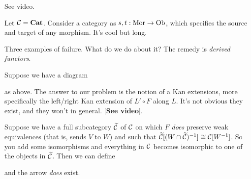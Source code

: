 \documentclass[class=report, crop=false,a4paper,twoside]{standalone}
\begin{document}
\begin{example}[(Limits)]
	See video.
\end{example}

\begin{example}
	Let $\mathcal{C} = \mathbf{Cat}$. Consider a category as $s,t: \operatorname{Mor} \to \operatorname{Ob}$, which specifies the source and target of any morphism. It's cool but long.
\end{example}

Three examples of failure. What do we do about it? The remedy is \emph{derived functors}. 

Suppose we have a diagram
\begin{center}
\end{center}
as above. The answer to our problem is the notion of a Kan extensions, more specifically the left/right Kan extension of $L' \circ F$ along $L$. It's not obvious they exist, and they won't in general. [\textbf{See video}]. 

Suppose we have a full subcategory $\widetilde{\mathcal{C}}$ of $\mathcal{C}$ on which $F$ \emph{does} preserve weak equivalences (that is, sends $V$ to $W$) and such that $\widetilde{\mathcal{C}}[(W \cap \widetilde{\mathcal{C}})^{-1}] \cong \mathcal{C}[W^{-1}]$. So you add some isomorphisms and everything in $\mathcal{C}$ becomes isomorphic to one of the objects in $\widetilde{\mathcal{C}}$. Then we can define
\begin{center}
\end{center}
and the arrow \emph{does} exist. 
\end{document}
